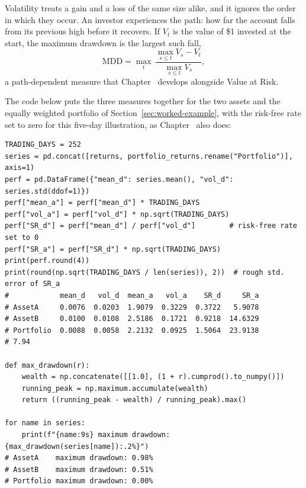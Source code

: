 \documentclass[../ai_in_finance]{subfiles}
\begin{document}
Volatility treats a gain and a loss of the same size alike, and it ignores the order in which they occur. An investor experiences the path: how far the account falls from its previous high before it recovers. If $V_t$ is the value of \$1 invested at the start, the maximum drawdown is the largest such fall,
\begin{equation}
\text{MDD} = \max_{t}\,\frac{\max_{s\le t} V_s - V_t}{\max_{s \le t} V_s},\label{eq:python-max-drawdown}
\end{equation}
a path-dependent measure that Chapter~ develops alongside Value at Risk.


The code below puts the three measures together for the two assets and the equally weighted portfolio of Section~\ref{sec:worked-example}, with the risk-free rate set to zero for this five-day illustration, as Chapter~ also does:

\begin{verbatim}
TRADING_DAYS = 252
series = pd.concat([returns, portfolio_returns.rename("Portfolio")], axis=1)
perf = pd.DataFrame({"mean_d": series.mean(), "vol_d": series.std(ddof=1)})
perf["mean_a"] = perf["mean_d"] * TRADING_DAYS
perf["vol_a"] = perf["vol_d"] * np.sqrt(TRADING_DAYS)
perf["SR_d"] = perf["mean_d"] / perf["vol_d"]        # risk-free rate set to 0
perf["SR_a"] = perf["SR_d"] * np.sqrt(TRADING_DAYS)
print(perf.round(4))
print(round(np.sqrt(TRADING_DAYS / len(series)), 2))  # rough std. error of SR_a
#            mean_d   vol_d  mean_a   vol_a    SR_d     SR_a
# AssetA     0.0076  0.0203  1.9079  0.3229  0.3722   5.9078
# AssetB     0.0100  0.0108  2.5186  0.1721  0.9218  14.6329
# Portfolio  0.0088  0.0058  2.2132  0.0925  1.5064  23.9138
# 7.94

def max_drawdown(r):
    wealth = np.concatenate([[1.0], (1 + r).cumprod().to_numpy()])
    running_peak = np.maximum.accumulate(wealth)
    return ((running_peak - wealth) / running_peak).max()

for name in series:
    print(f"{name:9s} maximum drawdown: {max_drawdown(series[name]):.2%}")
# AssetA    maximum drawdown: 0.98%
# AssetB    maximum drawdown: 0.51%
# Portfolio maximum drawdown: 0.00%
\end{verbatim}
\end{document}
